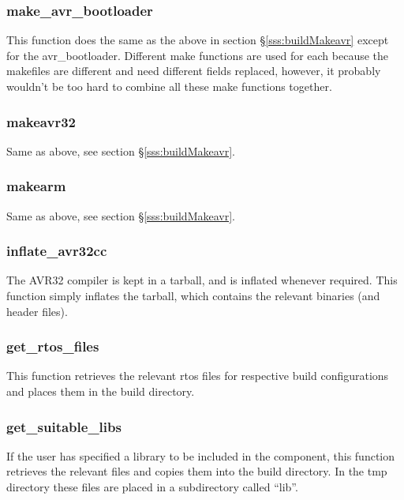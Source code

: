 \documentclass[a4paper, oneside, 11pt, titlepage, onecolumn, openright]{report}
\begin{document}
\subsubsection{make\_avr\_bootloader}
			\label{sss:buildMakeavrbootloader}
			This function does the same as the above in section \S\ref{sss:buildMakeavr} except for the avr\_bootloader. Different make functions are used for each because the makefiles are different and need different fields replaced, however, it probably wouldn't be too hard to combine all these make functions together.
			
\subsubsection{makeavr32}
			\label{sss:buildMakeavr32}
			Same as above, see section \S\ref{sss:buildMakeavr}.
			
\subsubsection{makearm}
			\label{sss:buildMakearm}
			Same as above, see section \S\ref{sss:buildMakeavr}.
			
\subsubsection{inflate\_avr32cc}
			\label{sss:buildInflateavr32cc}
			The AVR32 compiler is kept in a tarball, and is inflated whenever required. This function simply inflates the tarball, which contains the relevant binaries (and header files).
			
\subsubsection{get\_rtos\_files}
			\label{sss:buildGetrtosfiles}
			This function retrieves the relevant rtos files for respective build configurations and places them in the build directory.
			
\subsubsection{get\_suitable\_libs}
			\label{sss:buildGetsuitablelibs}
			If the user has specified a library to be included in the component, this function retrieves the relevant files and copies them into the build directory. In the tmp directory these files are placed in a subdirectory called ``lib''.
			
\end{document}
